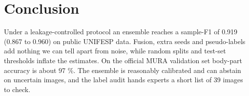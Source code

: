 \section{Conclusion}
Under a leakage-controlled protocol an ensemble reaches a sample-F1 of 0.919 (0.867 to 0.960) on public UNIFESP data. Fusion, extra seeds and pseudo-labels add nothing we can tell apart from noise, while random splits and test-set thresholds inflate the estimates. On the official MURA validation set body-part accuracy is about 97 \%. The ensemble is reasonably calibrated and can abstain on uncertain images, and the label audit hands experts a short list of 39 images to check.


